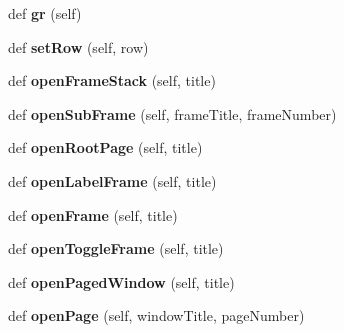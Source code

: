 \begin{DoxyCompactItemize}
def {\bfseries gr} (self)
\item 
\mbox{\label{class_python_01_g_u_i_1_1appjar_1_1gui_af595213a5a78351e6cd92bed2e3a5b9a}} 
def {\bfseries set\+Row} (self, row)
\item 
\mbox{\label{class_python_01_g_u_i_1_1appjar_1_1gui_a71498538a671029d2288bfc2fc3d969a}} 
def {\bfseries open\+Frame\+Stack} (self, title)
\item 
\mbox{\label{class_python_01_g_u_i_1_1appjar_1_1gui_a100c3fdcc8ff4f6861395c2eea9fff90}} 
def {\bfseries open\+Sub\+Frame} (self, frame\+Title, frame\+Number)
\item 
\mbox{\label{class_python_01_g_u_i_1_1appjar_1_1gui_a2ea008dbaffedb45079a49dfb501f0ac}} 
def {\bfseries open\+Root\+Page} (self, title)
\item 
\mbox{\label{class_python_01_g_u_i_1_1appjar_1_1gui_a025a2d305a85d1eae882ebe0137824ee}} 
def {\bfseries open\+Label\+Frame} (self, title)
\item 
\mbox{\label{class_python_01_g_u_i_1_1appjar_1_1gui_a4e57b3baae4eecf53897b7943c62dd22}} 
def {\bfseries open\+Frame} (self, title)
\item 
\mbox{\label{class_python_01_g_u_i_1_1appjar_1_1gui_a213561456e9d93f953d01efd8cfd798c}} 
def {\bfseries open\+Toggle\+Frame} (self, title)
\item 
\mbox{\label{class_python_01_g_u_i_1_1appjar_1_1gui_ad2f9c4b4630693b4b69d770e748d9ec4}} 
def {\bfseries open\+Paged\+Window} (self, title)
\item 
\mbox{\label{class_python_01_g_u_i_1_1appjar_1_1gui_ab421172662fa62aa768a7e57e8f9f047}} 
def {\bfseries open\+Page} (self, window\+Title, page\+Number)
\item 
\mbox{\label{class_python_01_g_u_i_1_1appjar_1_1gui_aa4b1dc0d904e89e84ec7cfa28852b712}} 

\end{DoxyCompactItemize}
